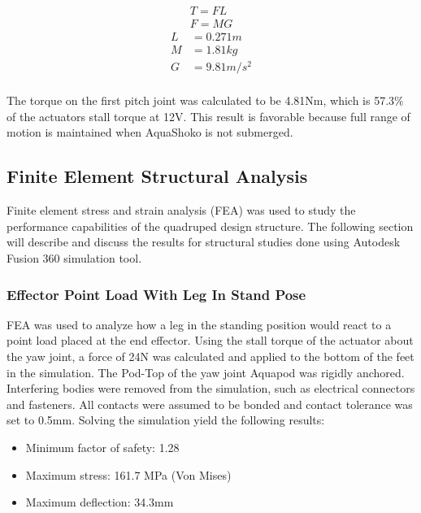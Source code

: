\begin{align}\label{eq:head}
    T = FL   \\
    F = MG
\end{align}
\begin{align*}
    L & = 0.271 m         \\
    M & = 1.81 kg       \\
    G & = 9.81 m/s^2    \\
\end{align*}

The torque on the first pitch joint was calculated to be 4.81Nm, which is 57.3\% of the actuators stall torque at 12V. This result is favorable because full range of motion is maintained when AquaShoko is not submerged.

\subsection{Finite Element Structural Analysis}
Finite element stress and strain analysis (FEA) was used to study the performance capabilities of the quadruped design structure. 
The following section will describe and discuss the results for structural studies done using Autodesk Fusion 360 simulation tool.

\subsubsection{Effector Point Load With Leg In Stand Pose } %
FEA was used to analyze how a leg in the standing position would react to a point load placed at the end effector. Using the stall torque of the actuator about the yaw joint, a force of 24N was calculated and applied to the bottom of the feet in the simulation. The Pod-Top of the yaw joint Aquapod was rigidly anchored. 
Interfering bodies were removed from the simulation, such as electrical connectors and fasteners. All contacts were assumed to be bonded and contact tolerance was set to 0.5mm.
Solving the simulation yield the following results:
 \begin{itemize}
     \item Minimum factor of safety: 1.28
     \item Maximum stress: 161.7 MPa (Von Mises)
     \item Maximum deflection: 34.3mm
 \end{itemize}




